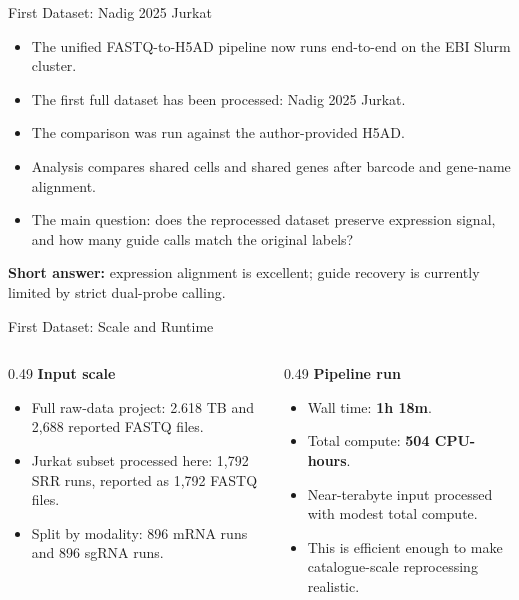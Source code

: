 \documentclass[handout,aspectratio=169]{beamer}
\begin{document}
\begin{frame}{First Dataset: Nadig 2025 Jurkat}
    \begin{itemize}
        \item The unified FASTQ-to-H5AD pipeline now runs end-to-end on the EBI Slurm cluster.
        \item The first full dataset has been processed: Nadig 2025 Jurkat.
        \item The comparison was run against the author-provided H5AD.
        \item Analysis compares shared cells and shared genes after barcode and gene-name alignment.
        \item The main question: does the reprocessed dataset preserve expression signal, and how many guide calls match the original labels?
    \end{itemize}
    \vspace{0.8em}
    \centering
    \textbf{Short answer:} expression alignment is excellent; guide recovery is currently limited by strict dual-probe calling.
\end{frame}

\begin{frame}{First Dataset: Scale and Runtime}
    \begin{columns}[T,onlytextwidth]
        \begin{column}{0.49\textwidth}
            \textbf{Input scale}
            \vspace{0.5em}
            \begin{itemize}
                \item Full raw-data project: 2.618 TB and 2,688 reported FASTQ files.
                \item Jurkat subset processed here: 1,792 SRR runs, reported as 1,792 FASTQ files.
                \item Split by modality: 896 mRNA runs and 896 sgRNA runs.
            \end{itemize}
        \end{column}
        \begin{column}{0.49\textwidth}
            \textbf{Pipeline run}
            \vspace{0.5em}
            \begin{itemize}
                \item Wall time: \textbf{1h 18m}.
                \item Total compute: \textbf{504 CPU-hours}.
                \item Near-terabyte input processed with modest total compute.
                \item This is efficient enough to make catalogue-scale reprocessing realistic.
            \end{itemize}
        \end{column}
    \end{columns}
\end{frame}
\end{document}
